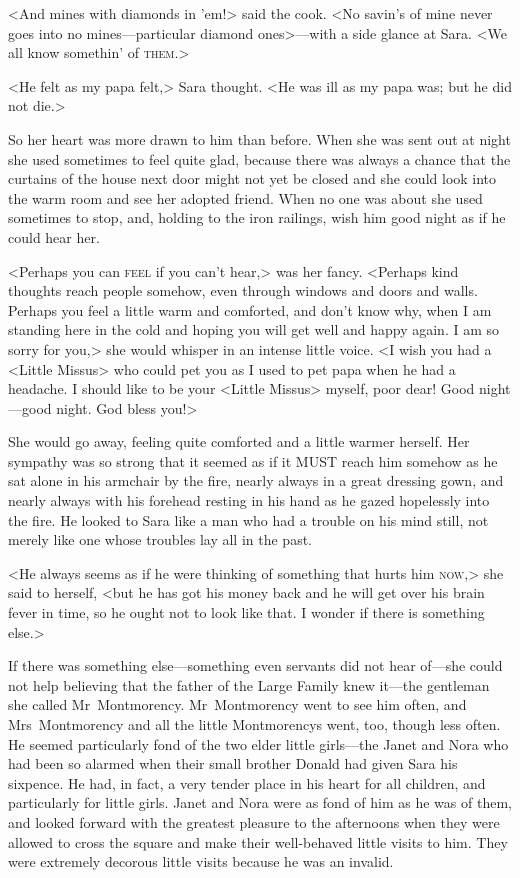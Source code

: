<And mines with diamonds in 'em!> said the cook. <No savin's of mine never goes into no mines—particular diamond ones>—with a side glance at Sara. <We all know somethin' of \textsc{them}.>

<He felt as my papa felt,> Sara thought. <He was ill as my papa was; but he did not die.>

So her heart was more drawn to him than before. When she was sent out at night she used sometimes to feel quite glad, because there was always a chance that the curtains of the house next door might not yet be closed and she could look into the warm room and see her adopted friend. When no one was about she used sometimes to stop, and, holding to the iron railings, wish him good night as if he could hear her.

<Perhaps you can \textsc{feel} if you can't hear,> was her fancy. <Perhaps kind thoughts reach people somehow, even through windows and doors and walls. Perhaps you feel a little warm and comforted, and don't know why, when I am standing here in the cold and hoping you will get well and happy again. I am so sorry for you,> she would whisper in an intense little voice. <I wish you had a <Little Missus> who could pet you as I used to pet papa when he had a headache. I should like to be your <Little Missus> myself, poor dear! Good night—good night. God bless you!>

She would go away, feeling quite comforted and a little warmer herself. Her sympathy was so strong that it seemed as if it MUST reach him somehow as he sat alone in his armchair by the fire, nearly always in a great dressing gown, and nearly always with his forehead resting in his hand as he gazed hopelessly into the fire. He looked to Sara like a man who had a trouble on his mind still, not merely like one whose troubles lay all in the past.

<He always seems as if he were thinking of something that hurts him \textsc{now},> she said to herself, <but he has got his money back and he will get over his brain fever in time, so he ought not to look like that. I wonder if there is something else.>

If there was something else—something even servants did not hear of—she could not help believing that the father of the Large Family knew it—the gentleman she called Mr~Montmorency. Mr~Montmorency went to see him often, and Mrs~Montmorency and all the little Montmorencys went, too, though less often. He seemed particularly fond of the two elder little girls—the Janet and Nora who had been so alarmed when their small brother Donald had given Sara his sixpence. He had, in fact, a very tender place in his heart for all children, and particularly for little girls. Janet and Nora were as fond of him as he was of them, and looked forward with the greatest pleasure to the afternoons when they were allowed to cross the square and make their well-behaved little visits to him. They were extremely decorous little visits because he was an invalid.

